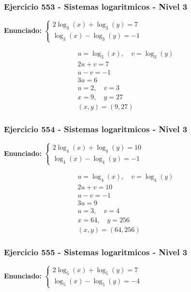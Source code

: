 \documentclass[12pt,a4paper]{article}
\begin{document}
\subsubsection*{Ejercicio 553 - Sistemas logaritmicos - Nivel 3}
\textbf{Enunciado:} \(\begin{cases} 2\log_{3}\left(x\right)+\log_{3}\left(y\right)=7\\ \log_{3}\left(x\right)-\log_{3}\left(y\right)=-1\end{cases}\)

\[
\begin{aligned}
u=\log_{3}\left(x\right),\quad v=\log_{3}\left(y\right)\\
2u+v=7\\
u-v=-1\\
3u=6\\
u=2,\quad v=3\\
x=9,\quad y=27\\
\boxed{(x,y)=(9,27)}
\end{aligned}
\]


\subsubsection*{Ejercicio 554 - Sistemas logaritmicos - Nivel 3}
\textbf{Enunciado:} \(\begin{cases} 2\log_{4}\left(x\right)+\log_{4}\left(y\right)=10\\ \log_{4}\left(x\right)-\log_{4}\left(y\right)=-1\end{cases}\)

\[
\begin{aligned}
u=\log_{4}\left(x\right),\quad v=\log_{4}\left(y\right)\\
2u+v=10\\
u-v=-1\\
3u=9\\
u=3,\quad v=4\\
x=64,\quad y=256\\
\boxed{(x,y)=(64,256)}
\end{aligned}
\]


\subsubsection*{Ejercicio 555 - Sistemas logaritmicos - Nivel 3}
\textbf{Enunciado:} \(\begin{cases} 2\log_{5}\left(x\right)+\log_{5}\left(y\right)=7\\ \log_{5}\left(x\right)-\log_{5}\left(y\right)=-4\end{cases}\)
\end{document}
